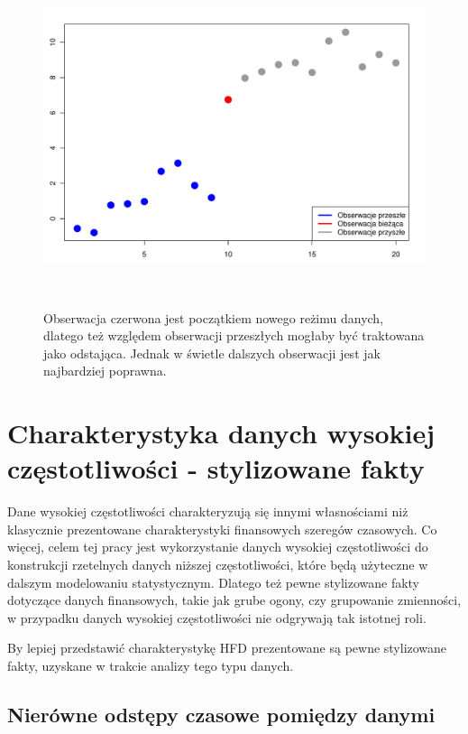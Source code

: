 \documentclass[a4paper,12pt,openany, DIV=calc, headsepline]{scrbook}
\begin{document}
\begin{figure}[H]
  \centering
  \includegraphics[width=170mm, height=100mm]{wykresy/odst2}
  \caption{Obserwacja czerwona jest początkiem nowego reżimu danych, dlatego też względem obserwacji przeszłych mogłaby być traktowana jako odstająca. Jednak w świetle dalszych obserwacji jest jak najbardziej poprawna.}
  \label{fig:odst2}
\end{figure}


\section{Charakterystyka danych wysokiej częstotliwości - stylizowane fakty}

Dane wysokiej częstotliwości charakteryzują się innymi własnościami niż klasycznie prezentowane charakterystyki finansowych szeregów czasowych. Co więcej, celem tej pracy jest wykorzystanie danych wysokiej częstotliwości do konstrukcji rzetelnych danych niższej częstotliwości, które będą użyteczne w dalszym modelowaniu statystycznym. Dlatego też pewne stylizowane fakty dotyczące danych finansowych, takie jak grube ogony, czy grupowanie zmienności, w przypadku danych wysokiej częstotliwości nie odgrywają tak istotnej roli.

By lepiej przedstawić charakterystykę HFD prezentowane są pewne stylizowane fakty, uzyskane w trakcie analizy tego typu danych.

\subsection{Nierówne odstępy czasowe pomiędzy danymi}
\end{document}
